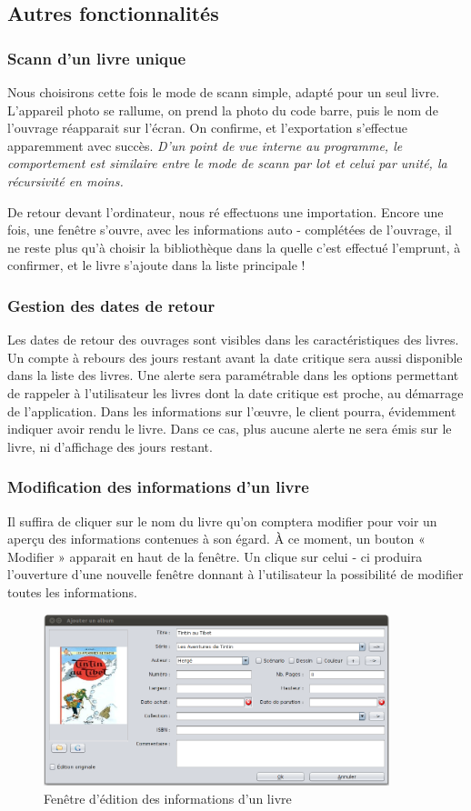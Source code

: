 \subsection {Autres fonctionnalités}

\subsubsection {Scann d'un livre unique}
Nous choisirons cette fois le mode de scann simple, adapté pour un seul livre. 
L'appareil photo se rallume, on prend la photo du code barre, puis le nom de l'ouvrage réapparait sur l'écran.
On confirme, et l'exportation s'effectue apparemment avec succès. 
\emph{D'un point de vue interne au programme, le comportement est similaire entre le mode de scann par lot et celui par unité, la récursivité en moins.}

De retour devant l'ordinateur, nous ré effectuons une importation. 
Encore une fois, une fenêtre s'ouvre, avec les informations auto - complétées de l'ouvrage, il ne reste plus qu'à choisir la bibliothèque dans la quelle c'est effectué l'emprunt, à confirmer, et le livre s'ajoute dans la liste principale !

\subsubsection {Gestion des dates de retour}
Les dates de retour des ouvrages sont visibles dans les caractéristiques des livres. 
Un compte à rebours des jours restant avant la date critique sera aussi disponible dans la liste des livres.
Une alerte sera paramétrable dans les options permettant de rappeler à l'utilisateur les livres dont la date critique est proche, au démarrage de l'application.
Dans les informations sur l'œuvre, le client pourra, évidemment indiquer avoir rendu le livre.
Dans ce cas, plus aucune alerte ne sera émis sur le livre, ni d'affichage des jours restant.

\subsubsection {Modification des informations d'un livre}
Il suffira de cliquer sur le nom du livre qu'on comptera modifier pour voir un aperçu des informations contenues à son égard.
À ce moment, un bouton « Modifier » apparait en haut de la fenêtre.
Un clique sur celui - ci produira l'ouverture d'une nouvelle fenêtre donnant à l'utilisateur la possibilité de modifier toutes les informations.

\begin{figure}[h]
\begin{center}
\includegraphics[height=5cm]{../img/editionAlbum.png}
\end{center}
\caption{Fenêtre d'édition des informations d'un livre}
\end{figure}
